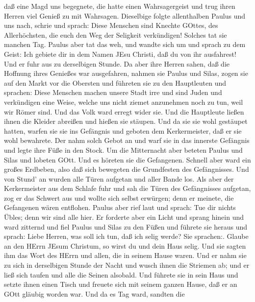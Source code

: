 daß eine Magd uns begegnete, die hatte einen Wahrsagergeist und trug
ihren Herren viel Genieß zu mit Wahrsagen.  Dieselbige
folgte allenthalben Paulus und uns nach, schrie und sprach: Diese
Menschen sind Knechte GOttes, des Allerhöchsten, die euch den Weg der
Seligkeit verkündigen!  Solches tat sie manchen Tag. Paulus
aber tat das weh, und wandte sich um und sprach zu dem Geist: Ich
gebiete dir in dem Namen JEsu Christi, daß du von ihr ausfahrest! Und er
fuhr aus zu derselbigen Stunde.  Da aber ihre Herren sahen,
daß die Hoffnung ihres Genießes war ausgefahren, nahmen sie Paulus und
Silas, zogen sie auf den Markt vor die Obersten  und
führeten sie zu den Hauptleuten und sprachen: Diese Menschen machen
unsere Stadt irre und sind Juden  und verkündigen eine
Weise, welche uns nicht ziemet anzunehmen noch zu tun, weil wir Römer
sind.  Und das Volk ward erregt wider sie. Und die
Hauptleute ließen ihnen die Kleider abreißen und hießen sie stäupen.
 Und da sie sie wohl gestäupet hatten, warfen sie sie ins
Gefängnis und geboten dem Kerkermeister, daß er sie wohl bewahrete.
 Der nahm solch Gebot an und warf sie in das innerste
Gefängnis und legte ihre Füße in den Stock.  Um die
Mitternacht aber beteten Paulus und Silas und lobeten GOtt. Und es
höreten sie die Gefangenen.  Schnell aber ward ein großes
Erdbeben, also daß sich bewegeten die Grundfesten des Gefängnisses. Und
von Stund' an wurden alle Türen aufgetan und aller Bande los.
 Als aber der Kerkermeister aus dem Schlafe fuhr und sah
die Türen des Gefängnisses aufgetan, zog er das Schwert aus und wollte
sich selbst erwürgen; denn er meinete, die Gefangenen wären entflohen.
 Paulus aber rief laut und sprach: Tue dir nichts Übles;
denn wir sind alle hier.  Er forderte aber ein Licht und
sprang hinein und ward zitternd und fiel Paulus und Silas zu den Füßen
 und führete sie heraus und sprach: Liebe Herren, was soll
ich tun, daß ich selig werde?  Sie sprachen:. Glaube an den
HErrn JEsum Christum, so wirst du und dein Haus selig.  Und
sie sagten ihm das Wort des HErrn und allen, die in seinem Hause waren.
 Und er nahm sie zu sich in derselbigen Stunde der Nacht
und wusch ihnen die Striemen ab; und er ließ sich taufen und alle die
Seinen alsobald.  Und führete sie in sein Haus und setzte
ihnen einen Tisch und freuete sich mit seinem ganzen Hause, daß er an
GOtt gläubig worden war.  Und da es Tag ward, sandten die
